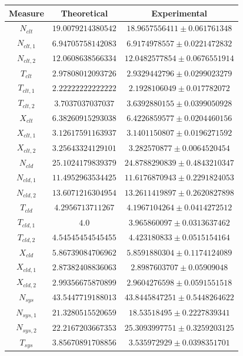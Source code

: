 \begin{figure}
	\begin{center}
		\begin{tabular}{|c||c|c|}
\hline
Measure & Theoretical & Experimental \\
\hline
$N_{clt}$  & $19.0079214380542$ & $18.9657556411\pm 0.061761348$ \\ 
$N_{clt,1}$  & $6.94705758142083$ & $6.9174978557\pm 0.0221472832$ \\ 
$N_{clt,2}$  & $12.0608638566334$ & $12.0482577854\pm 0.0676551914$ \\ 
$T_{clt}$  & $2.97808012093726$ & $2.9329442796\pm 0.0299023279$ \\ 
$T_{clt,1}$  & $2.22222222222222$ & $2.1928106049\pm 0.017782072$ \\ 
$T_{clt,2}$  & $3.7037037037037$ & $3.6392880155\pm 0.0399050928$ \\ 
$X_{clt}$  & $6.38260915293038$ & $6.4226859577\pm 0.0204460156$ \\ 
$X_{clt,1}$  & $3.12617591163937$ & $3.1401150807\pm 0.0196271592$ \\ 
$X_{clt,2}$  & $3.25643324129101$ & $3.282570877\pm 0.0064520454$ \\ 
\hline 
$N_{cld}$  & $25.1024179839379$ & $24.8788290839\pm 0.4843210347$ \\ 
$N_{cld,1}$  & $11.4952963534425$ & $11.6176870943\pm 0.2291824053$ \\ 
$N_{cld,2}$  & $13.6071216304954$ & $13.2611419897\pm 0.2620827898$ \\ 
$T_{cld}$  & $4.2956713711267$ & $4.1967104264\pm 0.0414272512$ \\ 
$T_{cld,1}$  & $4.0$ & $3.965860097\pm 0.0313637462$ \\ 
$T_{cld,2}$  & $4.54545454545455$ & $4.423180833\pm 0.0515154164$ \\ 
$X_{cld}$  & $5.86739084706962$ & $5.8591880304\pm 0.1174124089$ \\ 
$X_{cld,1}$  & $2.87382408836063$ & $2.8987603707\pm 0.05909048$ \\ 
$X_{cld,2}$  & $2.99356675870899$ & $2.9604276598\pm 0.0591551518$ \\ 
\hline 
$N_{sys}$  & $43.5447719188013$ & $43.8445847251\pm 0.5448264622$ \\ 
$N_{sys,1}$  & $21.3280515520659$ & $18.53518495\pm 0.2227839341$ \\ 
$N_{sys,2}$  & $22.2167203667353$ & $25.3093997751\pm 0.3259203125$ \\ 
$T_{sys}$  & $3.85670891708856$ & $3.535972929\pm 0.0398351701$ \\ 

\end{tabular}
\end{center}
\end{figure}
